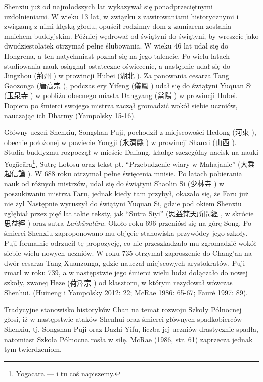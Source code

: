 Shenxiu już od najmłodszych lat wykazywał się ponadprzeciętnymi uzdolnieniami.
W wieku 13 lat, w związku z zawirowaniami historycznymi i związaną z nimi klęską głodu, opuścił rodzinny dom z zamiarem zostania mnichem buddyjskim.
Później wędrował od świątyni do świątyni, by wreszcie jako dwudziestolatek otrzymać pełne ślubowania.
W wieku 46 lat udał się do Hongrena, a ten natychmiast poznał się na jego talencie.
Po wielu latach studiowania nauk osiągnął ostateczne oświecenie, a następnie udał się do Jingzhou (荊州 ) w prowincji Hubei (湖北 ).
Za panowania cesarza Tang Gaozonga (唐高宗 ), podczas ery Yifeng (儀鳳 ) udał się do świątyni Yuquan Si (玉泉寺 ) w pobliżu obecnego miasta Dangyang (當陽 ) w prowincji Hubei.
Dopiero po śmierci swojego mistrza zaczął gromadzić wokół siebie uczniów, nauczając ich Dharmy
(Yampolsky 15-16).

Główny uczeń Shenxiu, Songshan Puji, pochodził z miejscowości Hedong (河東 ), obecnie położonej w powiecie Yongji (永濟縣 ) w prowincji Shanxi (山西 ).
Studia buddyzmu rozpoczął w mieście Daliang, kładąc szczególny nacisk na nauki Yogācāra\footnote{Yogācāra --- i tu coś napiszemy.}, Sutrę Lotosu oraz tekst pt. ``Przebudzenie wiary w Mahajanie'' (大乘起信論 ).
W 688 roku otrzymał pełne święcenia mnisie.
Po latach pobierania nauk od różnych mistrzów, udał się do świątyni Shaolin Si (少林寺 ) w poszukiwaniu mistrza Faru, jednak kiedy tam przybył, okazało się, że Faru już nie żył
Następnie wyruszył do świątyni Yuquan Si, gdzie pod okiem Shenxiu zgłębiał przez pięć lat takie teksty, jak ``Sutra Siyi'' (思益梵天所問經 , w skrócie 思益經 ) oraz sutra \textit{La\.nkā\-vatāra}.
Około roku 696 przeniósł się na górę Song.
Po śmierci Shenxiu zaproponowano mu objęcie stanowiska przywódcy jego szkoły.
Puji formalnie odrzucił tę propozycję, co nie przeszkadzało mu zgromadzić wokół siebie wielu nowych uczniów.
W roku 735 otrzymał zaproszenie do Chang'an na dwór cesarza Tang Xuanzonga, gdzie nauczał miejscowych arystokratów.
Puji zmarł w roku 739, a w następstwie jego śmierci wielu ludzi dołączało do nowej szkoły, zwanej Heze (荷澤宗 ) od klasztoru, w którym rezydował wówczas Shenhui. %
(Huineng i Yampolsky 2012: 22; McRae 1986: 65-67; Fauré 1997: 89).

Tradycyjne stanowisko historyków Chan na temat rozwoju Szkoły Północnej głosi, iż w następstwie ataków Shenhui oraz śmierci głównych spadkobierców Shenxiu, tj. Songshan Puji oraz Dazhi Yifu, liczba jej uczniów drastycznie spadła, natomiast Szkoła Północna rosła w siłę.
McRae (1986, str. 61) zaprzecza jednak tym twierdzeniom.

